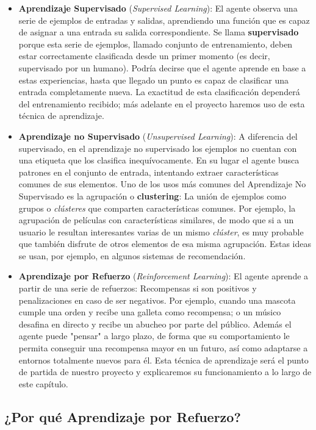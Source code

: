 \begin{itemize}
    \item \textbf{Aprendizaje Supervisado} (\textit{Supervised Learning}): El agente observa una serie de ejemplos de entradas y salidas, aprendiendo una función que es capaz de asignar a una entrada su salida correspondiente. Se llama \textbf{supervisado} porque esta serie de ejemplos, llamado conjunto de entrenamiento, deben estar correctamente clasificada desde un primer momento (es decir, supervisado por un humano). Podría decirse que el agente aprende en base a estas experiencias, hasta que llegado un punto es capaz de clasificar una entrada completamente nueva. La exactitud de esta clasificación dependerá del entrenamiento recibido; más adelante en el proyecto haremos uso de esta técnica de aprendizaje.
    \item \textbf{Aprendizaje no Supervisado} (\textit{Unsupervised Learning}): A diferencia del supervisado, en el aprendizaje no supervisado los ejemplos no cuentan con una etiqueta que los clasifica inequívocamente. En su lugar el agente busca patrones en el conjunto de entrada, intentando extraer características comunes de sus elementos. Uno de los usos más comunes del Aprendizaje No Supervisado es la agrupación o \textbf{clustering}: La unión de ejemplos como grupos o \textit{clústeres} que comparten características comunes. Por ejemplo, la agrupación de películas con características similares, de modo que si a un usuario le resultan interesantes varias de un mismo \textit{clúster}, es muy probable que también disfrute de otros elementos de esa misma agrupación. Estas ideas se usan, por ejemplo, en algunos sistemas de recomendación.   
    \item \textbf{Aprendizaje por Refuerzo} (\textit{Reinforcement Learning}): El agente aprende a partir de una serie de refuerzos: Recompensas si son positivos y penalizaciones en caso de ser negativos. Por ejemplo, cuando una mascota cumple una orden y recibe una galleta como recompensa; o un músico desafina en directo y recibe un abucheo por parte del público. Además el agente puede "pensar" a largo plazo, de forma que su comportamiento le permita conseguir una recompensa mayor en un futuro, así como adaptarse a entornos totalmente nuevos para él. Esta técnica de aprendizaje será el punto de partida de nuestro proyecto y explicaremos su funcionamiento a lo largo de este capítulo. 
\end{itemize}


\subsection{¿Por qué Aprendizaje por Refuerzo?}

